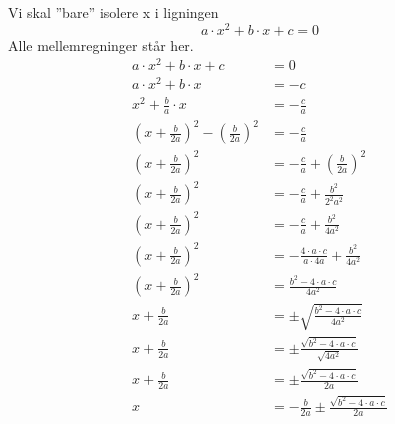 \documentclass[a4paper, 12pt]{article}
\date{}
\title{}
\begin{document}
Vi skal ''bare'' isolere x i ligningen
$$a\cdot x^2 + b \cdot x + c = 0$$
Alle mellemregninger står her.
\begin{align*}
a\cdot x^2 + b \cdot x + c &= 0 \\
a\cdot x^2 + b \cdot x &= -c \\
x^2 + \frac{b}{a} \cdot x &= -\frac{c}{a} \\
\left( x + \frac{b}{2 a} \right)^2 - \left( \frac{b}{2 a} \right)^2 &= - \frac{c}{a} \\
\left( x + \frac{b}{2 a} \right)^2  &= - \frac{c}{a}+\left( \frac{b}{2 a} \right)^2  \\
\left( x + \frac{b}{2 a} \right)^2  &= - \frac{c}{a}+\frac{b^2}{2^2 a^2}   \\
\left( x + \frac{b}{2 a} \right)^2  &= - \frac{c}{a}+\frac{b^2}{4 a^2}   \\
\left( x + \frac{b}{2 a} \right)^2  &= - \frac{4\cdot a \cdot c}{a\cdot 4 a}+\frac{b^2}{4 a^2}   \\
\left( x + \frac{b}{2 a} \right)^2  &= \frac{b^2 -4\cdot a \cdot c}{4 a^2}   \\
x + \frac{b}{2 a}   &= \pm \sqrt{\frac{b^2 -4\cdot a \cdot c}{4 a^2}}   \\
x + \frac{b}{2 a}   &= \pm \frac{\sqrt{b^2 -4\cdot a \cdot c}}{\sqrt{4 a^2}}   \\
x + \frac{b}{2 a}   &= \pm \frac{\sqrt{b^2 -4\cdot a \cdot c}}{2 a}   \\
x    &= -\frac{b}{2 a} \pm \frac{\sqrt{b^2 -4\cdot a \cdot c}}{2 a}   \\
\end{align*}
\end{document}
